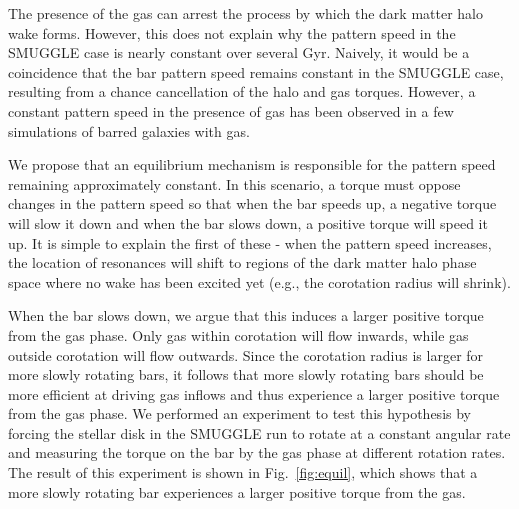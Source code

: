 \documentclass{natureprintstyle}
\begin{document}
The presence of the gas can arrest the process by which the dark matter halo
wake forms. However, this does not explain why the pattern speed in the
SMUGGLE case is nearly constant over several Gyr. Naively, it would be a
coincidence that the bar pattern speed remains constant in the SMUGGLE case,
resulting from a chance cancellation of the halo and gas torques. However, a
constant pattern speed in the presence of gas has been observed in a few
simulations of barred galaxies with gas.\cite{1993AA...268...65F,
2010ApJ...719.1470V}

We propose that an equilibrium mechanism is responsible for the pattern speed
remaining approximately constant. In this scenario, a torque must oppose
changes in the pattern speed so that when the bar speeds up, a negative torque
will slow it down and when the bar slows down, a positive torque will speed it
up. It is simple to explain the first of these - when the pattern speed
increases, the location of resonances will shift to regions of the dark matter
halo phase space where no wake has been excited yet (e.g., the corotation
radius will shrink).

When the bar slows down, we argue that this induces a larger positive torque
from the gas phase. Only gas within corotation will flow inwards, while gas
outside corotation will flow outwards.\cite{2011MNRAS.415.1027H} Since the
corotation radius is larger for more slowly rotating bars, it follows that
more slowly rotating bars should be more efficient at driving gas inflows and
thus experience a larger positive torque from the gas phase. We performed an
experiment to test this hypothesis by forcing the stellar disk in the SMUGGLE
run to rotate at a constant angular rate and measuring the torque on the bar
by the gas phase at different rotation rates. The result of this experiment is
shown in Fig.~\ref{fig:equil}, which shows that a more slowly rotating bar
experiences a larger positive torque from the gas.
\end{document}
